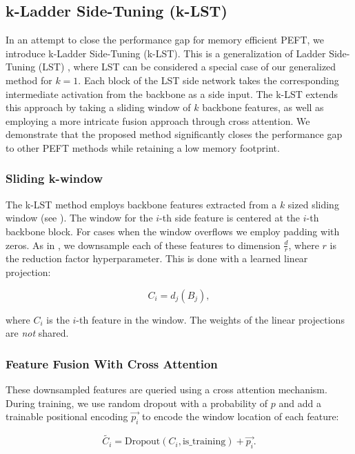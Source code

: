 \subsection{k-Ladder Side-Tuning (k-LST)}

In an attempt to close the performance gap for memory efficient PEFT, we introduce k-Ladder Side-Tuning (k-LST). This is a generalization of Ladder Side-Tuning (LST) \cite{sung2022lst}, where LST can be considered a special case of our generalized method for \(k = 1\). Each block of the LST side network takes the corresponding intermediate activation from the backbone as a side input. The k-LST extends this approach by taking a sliding window of $k$ backbone features, as well as employing a more intricate fusion approach through cross attention. We demonstrate that the proposed method significantly closes the performance gap to other PEFT methods while retaining a low memory footprint.


\subsubsection{Sliding k-window}
The k-LST method employs backbone features extracted from a \(k\) sized sliding window (see ). The window for the \(i\)-th side feature is centered at the \(i\)-th backbone block. For cases when the window overflows we employ padding with zeros. As in \cite{sung2022lst}, we downsample each of these features to dimension \(\frac{d}{r}\), where \(r\) is the reduction factor hyperparameter. This is done with a learned linear projection:

\begin{equation}
C_i = d_j(B_j),
\end{equation}

where $C_i$ is the $i$-th feature in the window. The weights of the linear projections are \textit{not} shared.

\subsubsection{Feature Fusion With Cross Attention}
These downsampled features are queried using a cross attention mechanism. During training, we use random dropout \cite{JMLR:v15:srivastava14a} with a probability of \(p\) and add a trainable positional encoding \(\vec{p_i}\) to encode the window location of each feature:

\begin{equation}
    \tilde{C_i} = \text{{Dropout}}(C_i, \text{{is\_training}}) + \vec{p_i}.
\end{equation}

